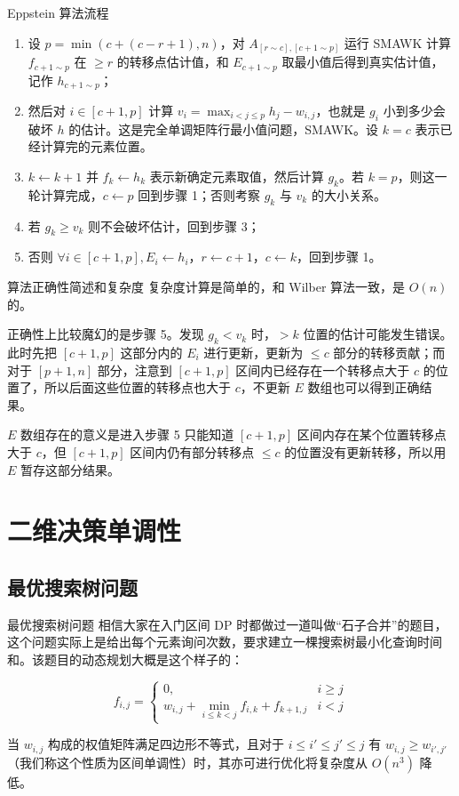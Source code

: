 \documentclass{beamer}
\begin{document}
\begin{frame}{Eppstein 算法流程}
	\begin{enumerate}
		\item 设 $p=\min(c+(c-r+1),n)$，对 $A_{[r \sim c],[c+1 \sim p]}$ 运行 SMAWK 计算 $f_{c+1 \sim p}$ 在 $\geq r$ 的转移点估计值，和 $E_{c+1 \sim p}$ 取最小值后得到真实估计值，记作 $h_{c+1 \sim p}$；
		\item 然后对 $i\in[c+1,p]$ 计算 $v_i = \max_{i < j \leq p} h_j-w_{i,j}$，也就是 $g_i$ 小到多少会破坏 $h$ 的估计。这是完全单调矩阵行最小值问题，SMAWK。设 $k=c$ 表示已经计算完的元素位置。
		\item $k \leftarrow k+1$ 并 $f_k \leftarrow h_k$ 表示新确定元素取值，然后计算 $g_k$。若 $k=p$，则这一轮计算完成，$c \leftarrow p$ 回到步骤 1；否则考察 $g_k$ 与 $v_k$ 的大小关系。
		\item 若 $g_k \geq v_k$ 则不会破坏估计，回到步骤 3；
		\item 否则 $\forall i\in[c+1,p],E_i \leftarrow h_i$，$r \leftarrow c+1$，$c \leftarrow k$，回到步骤 1。
	\end{enumerate}
\end{frame}
\begin{frame}{算法正确性简述和复杂度}
	复杂度计算是简单的，和 Wilber 算法一致，是 $O(n)$ 的。
	
	正确性上比较魔幻的是步骤 5。发现 $g_k<v_k$ 时，$> k$ 位置的估计可能发生错误。此时先把 $[c+1,p]$ 这部分内的 $E_i$ 进行更新，更新为 $\leq c$ 部分的转移贡献；而对于 $[p+1,n]$ 部分，注意到 $[c+1,p]$ 区间内已经存在一个转移点大于 $c$ 的位置了，所以后面这些位置的转移点也大于 $c$，不更新 $E$ 数组也可以得到正确结果。
	
	$E$ 数组存在的意义是进入步骤 5 只能知道 $[c+1,p]$ 区间内存在某个位置转移点大于 $c$，但 $[c+1,p]$ 区间内仍有部分转移点 $\leq c$ 的位置没有更新转移，所以用 $E$ 暂存这部分结果。
\end{frame}
\section{二维决策单调性}
\subsection{最优搜索树问题}
\begin{frame}{最优搜索树问题}
相信大家在入门区间 DP 时都做过一道叫做“石子合并”的题目，这个问题实际上是给出每个元素询问次数，要求建立一棵搜索树最小化查询时间和。该题目的动态规划大概是这个样子的：

$$f_{i,j} = \begin{cases}
0, &i \geq j \\
w_{i,j}+\min_{i \leq k < j} f_{i,k} + f_{k+1,j} &i<j
\end{cases}$$

当 $w_{i,j}$ 构成的权值矩阵满足四边形不等式，且对于 $i \leq i' \leq j' \leq j$ 有 $w_{i,j} \geq w_{i',j'}$（我们称这个性质为区间单调性）时，其亦可进行优化将复杂度从 $O(n^3)$ 降低。
\end{frame}
\end{document}
